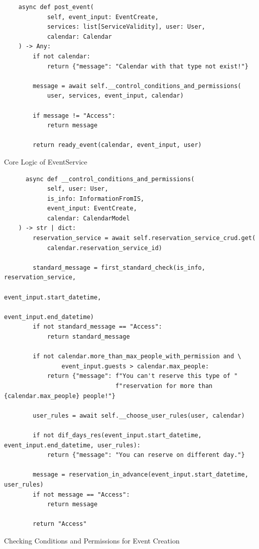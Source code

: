 \begin{listing}
\begin{verbatim}
    async def post_event(
            self, event_input: EventCreate,
            services: list[ServiceValidity], user: User,
            calendar: Calendar
    ) -> Any:
        if not calendar:
            return {"message": "Calendar with that type not exist!"}

        message = await self.__control_conditions_and_permissions(
            user, services, event_input, calendar)

        if message != "Access":
            return message

        return ready_event(calendar, event_input, user)
\end{verbatim}
\caption{Core Logic of EventService}
\label{list:core-event-reservation}
\end{listing}

\begin{listing}[t]
  \begin{verbatim}
      async def __control_conditions_and_permissions(
            self, user: User,
            is_info: InformationFromIS,
            event_input: EventCreate,
            calendar: CalendarModel
    ) -> str | dict:
        reservation_service = await self.reservation_service_crud.get(
            calendar.reservation_service_id)

        standard_message = first_standard_check(is_info, reservation_service,
                                                event_input.start_datetime,
                                                event_input.end_datetime)
        if not standard_message == "Access":
            return standard_message

        if not calendar.more_than_max_people_with_permission and \
                event_input.guests > calendar.max_people:
            return {"message": f"You can't reserve this type of "
                               f"reservation for more than {calendar.max_people} people!"}

        user_rules = await self.__choose_user_rules(user, calendar)

        if not dif_days_res(event_input.start_datetime, event_input.end_datetime, user_rules):
            return {"message": "You can reserve on different day."}

        message = reservation_in_advance(event_input.start_datetime, user_rules)
        if not message == "Access":
            return message

        return "Access"
  \end{verbatim}
  \caption{Checking Conditions and Permissions for Event Creation}
  \label{list:control-conditions-permissions}
  \end{listing}


